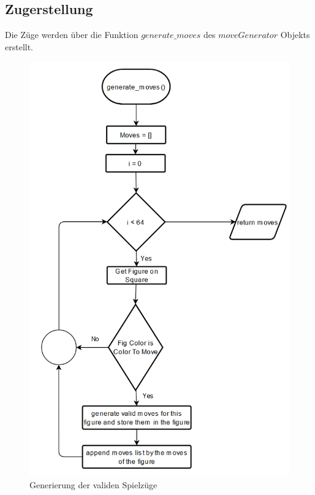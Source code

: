 \subsection{Zugerstellung}
Die Züge werden über die Funktion \(generate\_moves\) des \(moveGenerator\) Objekts erstellt.
\begin{figure}[H]
    \centering
    \includegraphics[scale=0.6]{images/generate_moves_function.png}
    \caption{Generierung der validen Spielzüge}
\end{figure}

